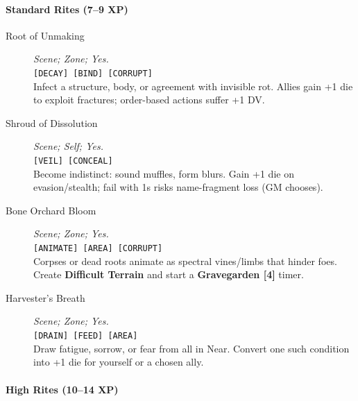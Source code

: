 \documentclass[11pt]{article}
\begin{document}
\paragraph*{Standard Rites (7--9 XP)}

\begin{description}

  \item[Root of Unmaking] \emph{Scene; Zone; Yes.} \\
  \texttt{[DECAY] [BIND] [CORRUPT]} \\
  Infect a structure, body, or agreement with invisible rot.  
  Allies gain +1 die to exploit fractures; order-based actions suffer +1 DV.

  \item[Shroud of Dissolution] \emph{Scene; Self; Yes.} \\
  \texttt{[VEIL] [CONCEAL]} \\
  Become indistinct: sound muffles, form blurs. Gain +1 die on evasion/stealth; fail with 1s risks name-fragment loss (GM chooses).

  \item[Bone Orchard Bloom] \emph{Scene; Zone; Yes.} \\
  \texttt{[ANIMATE] [AREA] [CORRUPT]} \\
  Corpses or dead roots animate as spectral vines/limbs that hinder foes.  
  Create \textbf{Difficult Terrain} and start a \textbf{Gravegarden [4]} timer.

  \item[Harvester's Breath] \emph{Scene; Zone; Yes.} \\
  \texttt{[DRAIN] [FEED] [AREA]} \\
  Draw fatigue, sorrow, or fear from all in Near.  
  Convert one such condition into +1 die for yourself or a chosen ally.

\end{description}

\paragraph*{High Rites (10--14 XP)}
\end{document}

